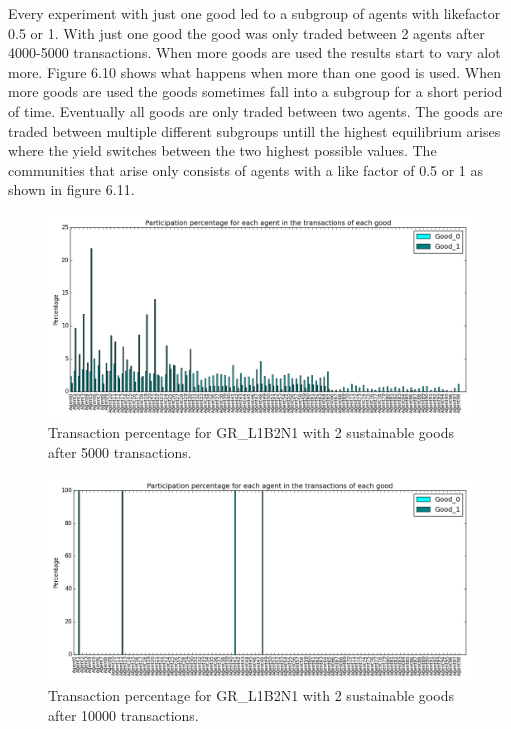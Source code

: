 \documentclass[twoside,openright]{uva-bachelor-thesis}
\begin{document}
 Every experiment with just one good led to a subgroup of agents with likefactor 0.5 or 1. With just one good the good was only traded between 2 agents after 4000-5000 transactions. When more goods are used the results start to vary alot more. Figure 6.10 shows what happens when more than one good is used. When more goods are used the goods sometimes fall into a subgroup for a short period of time. Eventually all goods are only traded between two agents. The goods are traded between multiple different subgroups untill the highest equilibrium arises where the yield switches between the two highest possible values. The communities that arise only consists of agents with a like factor of 0.5 or 1 as shown in figure 6.11. \\
\begin{figure}[h!]
  \centering
  \includegraphics[scale=0.4]{Simulation2_figures/GR_L1B2N1/Figure3_2goods_5k}
  \caption{Transaction percentage for GR\_L1B2N1 with 2 sustainable goods after 5000 transactions.}
\end{figure}

\begin{figure}[h!]
  \centering
  \includegraphics[scale=0.4]{Simulation2_figures/GR_L1B2N1/Figure4_2goods_10k}
  \caption{Transaction percentage for GR\_L1B2N1 with 2 sustainable goods after 10000 transactions.}
\end{figure}
\end{document}
